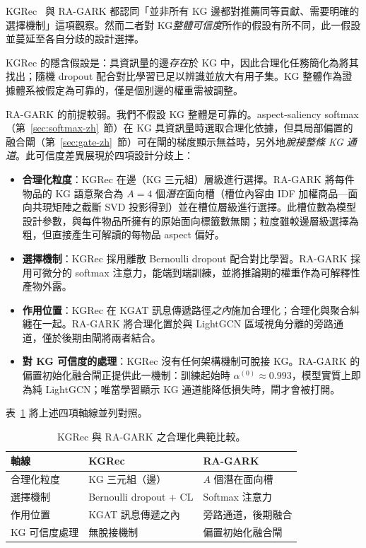 KGRec~\cite{yang2023kgrec} 與 RA-GARK 都認同「並非所有 KG 邊都對推薦同等貢獻、需要明確的選擇機制」這項觀察。然而二者對 KG\emph{整體可信度}所作的假設有所不同，此一假設並蔓延至各自分歧的設計選擇。

KGRec 的隱含假設是：具資訊量的邊\emph{存在}於 KG 中，因此合理化任務簡化為將其找出；隨機 dropout 配合對比學習已足以辨識並放大有用子集。KG 整體作為證據體系被假定為可靠的，僅是個別邊的權重需被調整。

RA-GARK 的前提較弱。我們不假設 KG 整體是可靠的。aspect-saliency softmax（第~\ref{sec:softmax-zh}~節）在 KG 具資訊量時選取合理化依據，但具局部偏置的融合閘（第~\ref{sec:gate-zh}~節）可在閘的梯度顯示無益時，另外地\emph{脫接整條 KG 通道}。此可信度差異展現於四項設計分歧上：

\begin{itemize}
  \item \textbf{合理化粒度}：KGRec 在邊（KG 三元組）層級進行選擇。RA-GARK 將每件物品的 KG 語意聚合為 $A=4$ 個\emph{潛在}面向槽（槽位內容由 IDF 加權商品—面向共現矩陣之截斷 SVD 投影得到）並在槽位層級進行選擇。此槽位數為模型設計參數，與每件物品所擁有的原始面向標籤數無關；粒度雖較邊層級選擇為粗，但直接產生可解讀的每物品 aspect 偏好。
  \item \textbf{選擇機制}：KGRec 採用離散 Bernoulli dropout 配合對比學習。RA-GARK 採用可微分的 softmax 注意力，能端到端訓練，並將推論期的權重作為可解釋性產物外露。
  \item \textbf{作用位置}：KGRec 在 KGAT 訊息傳遞路徑\emph{之內}施加合理化；合理化與聚合糾纏在一起。RA-GARK 將合理化置於與 LightGCN 區域視角分離的旁路通道，僅於後期由閘將兩者結合。
  \item \textbf{對 KG 可信度的處理}：KGRec 沒有任何架構機制可脫接 KG。RA-GARK 的偏置初始化融合閘正提供此一機制：訓練起始時 $\alpha^{(0)} \approx 0.993$，模型實質上即為純 LightGCN；唯當學習顯示 KG 通道能降低損失時，閘才會被打開。
\end{itemize}

表~\ref{tab:rw-kgrec-vs-ragark-zh} 將上述四項軸線並列對照。

\begin{table}[!htbp]
\centering
\caption{KGRec 與 RA-GARK 之合理化典範比較。}
\label{tab:rw-kgrec-vs-ragark-zh}
\begin{tabular}{l l l}
\toprule
軸線 & KGRec & RA-GARK \\
\midrule
合理化粒度       & KG 三元組（邊）         & $A$ 個潛在面向槽 \\
選擇機制         & Bernoulli dropout + CL  & Softmax 注意力 \\
作用位置         & KGAT 訊息傳遞之內       & 旁路通道，後期融合 \\
KG 可信度處理    & 無脫接機制              & 偏置初始化融合閘 \\
\bottomrule
\end{tabular}
\end{table}
\FloatBarrier

